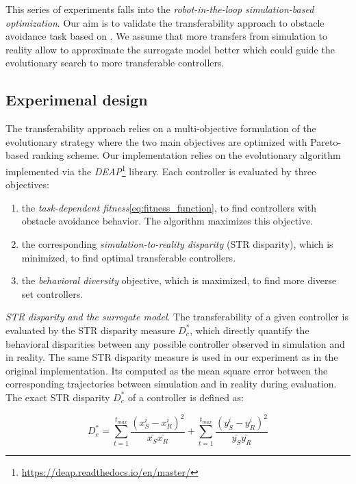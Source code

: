This series of experiments falls into the \emph{robot-in-the-loop simulation-based optimization}. Our aim is to validate the transferability approach to obstacle avoidance task based on \citep{koos2012transferability}. We assume that more transfers from simulation to reality allow to approximate the surrogate model better which could guide the evolutionary search to more transferable controllers.

\subsection{Experimenal design}

The transferability approach relies on a multi-objective formulation of the evolutionary strategy where the two main objectives are optimized with Pareto-based ranking scheme. Our implementation relies on the \citep{deb200fast} evolutionary algorithm implemented via the \emph{DEAP}\footnote{\url{https://deap.readthedocs.io/en/master/}} library. Each controller is evaluated by three objectives:

\begin{enumerate}
	\item the \emph{task-dependent fitness}\ref{eq:fitness_function}, to find controllers with obstacle avoidance behavior. 	The algorithm maximizes this objective.
	\item the corresponding \emph{simulation-to-reality disparity} (STR disparity), which is minimized, to find optimal transferable controllers.
	\item the \emph{behavioral diversity} objective, which is maximized, to find more diverse set controllers.
\end{enumerate}

\emph{STR disparity and the surrogate model}. The transferability of a given controller is evaluated by the  STR disparity measure \(D^{*}_{{c}}\), which directly quantify the behavioral disparities between any possible controller observed in simulation and in reality. The same STR disparity measure is used in our experiment as in the original implementation. Its computed as the mean square error between the corresponding trajectories between simulation and in reality during evaluation. The exact STR disparity \(D^{*}_{{c}}\) of a controller is defined as:

\begin{equation}
	D^{*}_{{c}} = \sum_{t=1}^{t_{max}} \frac{(x^{i}_{S} - x^{i}_{R})^{2}}{\bar{x_{S}}\bar{x_{R}}} + 							  \sum_{t=1}^{t_{max}} \frac{(y^{i}_{S} - y^{i}_{R})^{2}}{\bar{y_{S}}\bar{y_{R}}}
	\label{eq:The exact STR disparity measure.}
\end{equation}

